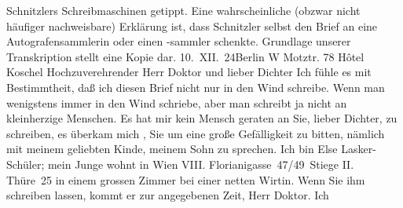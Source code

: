 \begin{ledgroupsized}[t]{13cm}
{                                 Schnitzlers Schreibmaschinen getippt. Eine wahrscheinliche (obzwar
                                 nicht häufiger nachweisbare) Erklärung ist, dass Schnitzler selbst den Brief an eine
                                 Autografensammlerin oder einen -sammler schenkte. Grundlage unserer
                                 Transkription stellt eine Kopie dar. }
\toendnotes[C]{\smallbreak}\pstart
           \noindent{}10. XII. 24\hfill Berlin W Motztr. 78\pend
           \pstart
           \raggedleft{}Hôtel Koschel\pend
           \pstart\center{}Hochzuverehrender Herr Doktor und lieber Dichter\pend\pstart
           Ich fühle es mit Bestimmtheit, daß ich diesen Brief nicht nur in \introOben{}den\introOben{} Wind schreibe. Wenn man wenigstens immer in den Wind schriebe, aber man
               schreibt ja nicht an kleinherzige Menschen. Es hat mir kein Mensch geraten an Sie,
               lieber Dichter, zu schreiben, es überkam mich \strikeout{\textcolor{gray}{×}}, Sie um eine große Gefälligkeit zu bitten, nämlich mit {\pb}meinem geliebten
                  Kinde, meinem Sohn zu sprechen. Ich bin
               Else Lasker-Schüler; mein Junge wohnt in Wien \introOben{}VIII.\introOben{} Florianigasse 47/49 Stiege II. \introOben{}Thüre 25\introOben{} in einem grossen Zimmer bei einer netten Wirtin. Wenn Sie ihm schreiben lassen, kommt er zur angegebenen Zeit, Herr Doktor. Ich

\end{ledgroupsized}
